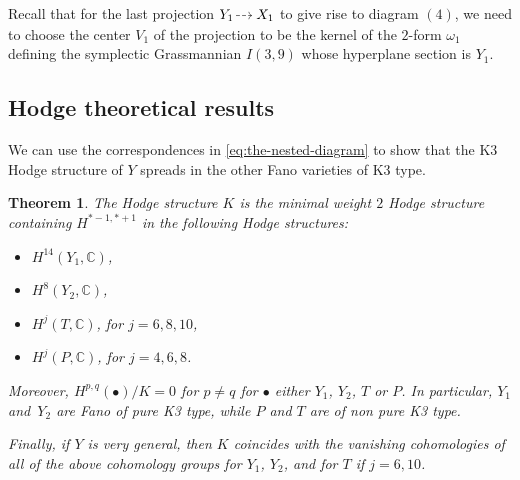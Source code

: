 \documentclass[JEP,XML,SOM,Unicode,NoEqCountersInSection]{cedram}
\newcommand{\sbullet}{{\scriptstyle\bullet}}
\newcommand{\dradpl}{{\hspace*{-2.5mm}\begin{tikzcd}[ampersand replacement=\&,column sep = scriptsize]\mbox{}\ar[r,dashed]\&\mbox{}\end{tikzcd}\hspace*{-2.5mm}}}
\newcommand{\dratst}{{\hspace*{-2.5mm}\begin{tikzcd}[ampersand replacement=\&,column sep = small]\mbox{}\ar[r,dashed]\&\mbox{}\end{tikzcd}\hspace*{-2mm}}}
\let\drascst\dratst
\newcommand{\dra}{\mathchoice{\dradpl}{\dratst}{\drascst}{\drascst}}
\let\dashrightarrow\dra
\theoremstyle{plain}
\newtheorem{theorem}{Theorem}\newtheorem*{theorem*}{Theorem}
\theoremstyle{definition}
\newcommand{\CC}{\mathbb{C}}
\begin{document}
Recall that for the last projection $Y_1 \dashrightarrow X_1$ to give rise to diagram $(4)$, we need to choose the center $V_1$ of the projection to be the kernel of the $2$-form $\omega_1$ defining the symplectic Grassmannian $I(3,9)$ whose hyperplane section is $Y_1$.

\subsection{Hodge theoretical results}
We can use the correspondences in \eqref{eq:the-nested-diagram} to show that the K3 Hodge structure of
$Y$ spreads in the other Fano varieties of K3 type.

\begin{theorem}\label{K}
The Hodge structure $K$ is the minimal weight $2$ Hodge structure containing $H^{*-1,*+1}$ in the following Hodge structures:
\begin{itemize}
\item $H^{14}(Y_1,\CC)$,
\item $H^8(Y_2,\CC)$,
\item $H^j(T,\CC)$, for $j=6,8,10$,
\item $H^j(P,\CC)$, for $j=4,6,8$.
\end{itemize}
Moreover, $H^{p,q}(\sbullet)/ K = 0$ for $p\neq q$ for $\sbullet$ either $Y_1$, $Y_2$, $T$ or $P$. In particular, $Y_1$ and~$Y_2$ are Fano of pure K3 type, while $P$ and $T$ are
of non pure K3 type.

Finally, if $Y$ is very general, then $K$ coincides with the vanishing cohomologies of all of the above cohomology groups for $Y_1$, $Y_2$, and for $T$ if $j=6,10$.
\end{theorem}
\end{document}
